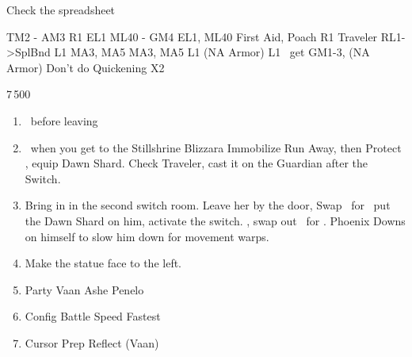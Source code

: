 \begin{liscense}
	Check the spreadsheet

	TM2 - AM3
	R1	EL1
	ML40 - GM4
	EL1, ML40
	First Aid, Poach					R1
	Traveler
	RL1->SplBnd
	L1					MA3, MA5
	MA3, MA5	L1
	(NA Armor)	L1
	\balthier\ get GM1-3, (NA Armor)
	Don't do Quickening X2
\end{liscense}
\begin{shop}{7\,500}
\end{shop}
\begin{enumerate}
	\item \save\ before leaving
	\item \save\ when you get to the Stillshrine
	      \ashef Blizzara \penelo
	      \penelof Immobilize \penelo
	      \vaanf Run Away, then Protect \vaan, equip Dawn Shard. Check Traveler, cast it on the Guardian after the Switch.
	\item Bring in \penelo in the second switch room. Leave her by the door, Swap \vaan\ for \balthier\, put the Dawn Shard on him, activate the switch. \leader{\penelo}, swap out \penelo\ for \vaan.
	      \balthierf Phoenix Downs on himself to slow him down for movement warps.
	\item Make the statue face to the left.
	\item Party	Vaan	Ashe	Penelo
	\item Config	Battle Speed	Fastest
	\item Cursor	Prep Reflect (Vaan)
\end{enumerate}

